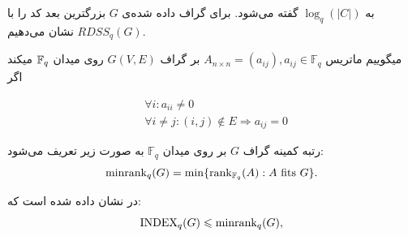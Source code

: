به
$\log_q(|C|)$
 گفته می‌شود. برای گراف داده شده‌ی $G$ بزرگترین بعد کد را با
 $RDSS_q(G)$
 نشان می‌دهیم.
  \begin{definition}
  	میگوییم ماتریس
  	$A_{n \times n} = (a_{ij}), a_{ij} \in \mathbb{F}_q$
  	بر گراف
  	$G(V, E)$
  	روی میدان
  	${\mathbb{F}_q}$
  	میکند اگر 
  	\begin{latin}
  		\begin{align*}
  			& \forall i : a_{ii} \ne 0 \\
  			& \forall i \ne j:  (i, j) \notin E \Rightarrow a_{ij} = 0
  		\end{align*}
  	\end{latin}
  \end{definition}
 \begin{definition}
 	رتبه کمینه گراف
 	$G$
 	بر روی میدان
 	$\mathbb{F}_q$
 	به صورت زیر تعریف می‌شود:
 	\begin{equation}
 		\mathrm{minrank}_q(G) = \min\{\operatorname{rank}_{\mathbb{F}_q}(A): A \text{ fits } G\}.
 	\end{equation}
 \end{definition}
 \begin{theorem}
 	در
 	\cite{4031356}
 	نشان داده شده است که:
 	\begin{equation}
 		\mathrm{INDEX}_q(G) \leqslant \mathrm{minrank}_q(G),
 		\label{eq:bary}
 	\end{equation} 
 \end{theorem}

